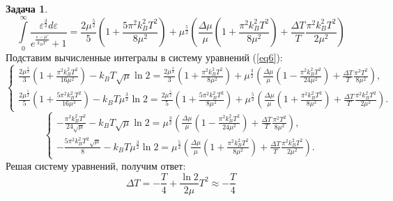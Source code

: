 \documentclass[12pt]{article}
\theoremstyle{definition}
\newtheorem{zad}{Задача}[section]
\begin{document}
\begin{zad}
\begin{equation}
\end{equation}
\begin{equation}
    \int\limits_0^\infty\frac{\varepsilon^{\frac{3}{2}}d\varepsilon}{e^{\frac{\varepsilon-\mu'}{k_BT'}}+1}=\frac{2\mu^\frac{5}{2}}{5}\left(1+\frac{5\pi^2k_B^2T^2}{8\mu^2}\right)+\mu^\frac{5}{2}\left(\frac{\Delta\mu}{\mu}\left(1+\frac{\pi^2k_B^2T^2}{8\mu^2}\right)+\frac{\Delta T}{T}\frac{\pi^2k_B^2T^2}{2\mu^2}\right)
\end{equation}
Подставим вычисленные интегралы в систему уравнений (\ref{eq6}):
\begin{equation*}
    \begin{cases}
    \frac{2\mu^\frac{3}{2}}{3}\left(1+\frac{\pi^2k_B^2T^2}{16\mu^2}\right)-k_BT\sqrt{\mu}\ln2=\frac{2\mu^{\frac{3}{2}}}{3}\left(1+\frac{\pi^2k_B^2T^2}{8\mu^2}\right)+\mu^\frac{3}{2}\left(\frac{\Delta\mu}{\mu}\left(1-\frac{\pi^2k_B^2T^2}{24\mu^2}\right)+\frac{\Delta T}{T}\frac{\pi^2T^2}{8\mu^2}\right),\\ \frac{2\mu^\frac{5}{2}}{5}\left(1+\frac{5\pi^2k_B^2T^2}{16\mu^2}\right)-k_BT\mu^\frac{3}{2}\ln2=\frac{2\mu^\frac{5}{2}}{5}\left(1+\frac{5\pi^2k_B^2T^2}{8\mu^2}\right)+\mu^\frac{5}{2}\left(\frac{\Delta\mu}{\mu}\left(1+\frac{\pi^2k_B^2T^2}{8\mu^2}\right)+\frac{\Delta T}{T}\frac{\pi^2k_B^2T^2}{2\mu^2}\right).
    \end{cases}
\end{equation*}
\begin{equation}
    \begin{cases}
    -\frac{\pi^2k_B^2T^2}{24\sqrt{\mu}}-k_BT\sqrt{\mu}\ln2=\mu^\frac{3}{2}\left(\frac{\Delta\mu}{\mu}\left(1-\frac{\pi^2k_B^2T^2}{24\mu^2}\right)+\frac{\Delta T}{T}\frac{\pi^2T^2}{8\mu^2}\right),\\ -\frac{5\pi^2k_B^2T^2\sqrt{\mu}}{8}-k_BT\mu^\frac{3}{2}\ln2=\mu^\frac{5}{2}\left(\frac{\Delta\mu}{\mu}\left(1+\frac{\pi^2k_B^2T^2}{8\mu^2}\right)+\frac{\Delta T}{T}\frac{\pi^2k_B^2T^2}{2\mu^2}\right).
    \end{cases}
\end{equation}
Решая систему уравнений, получим ответ:
\begin{equation}
    \boxed{\Delta T=-\frac{T}{4}+\frac{\ln 2}{2\mu}T^2\approx-\frac{T}{4}}
\end{equation}
\end{zad}
\end{document}
